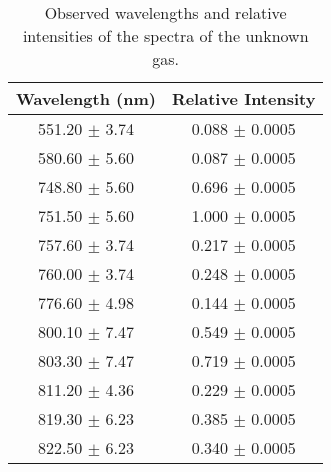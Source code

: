\begin{table}
    \begin{adjustbox}{width=0.5\textwidth, center}
        \begin{tabular}{|c|c|}
            \hline
            Wavelength (nm)   & Relative Intensity  \\
            \hline
            551.20 $\pm$ 3.74 & 0.088  $\pm$ 0.0005 \\
            580.60 $\pm$ 5.60 & 0.087  $\pm$ 0.0005 \\
            748.80 $\pm$ 5.60 & 0.696  $\pm$ 0.0005 \\
            751.50 $\pm$ 5.60 & 1.000  $\pm$ 0.0005 \\
            757.60 $\pm$ 3.74 & 0.217  $\pm$ 0.0005 \\
            760.00 $\pm$ 3.74 & 0.248  $\pm$ 0.0005 \\
            776.60 $\pm$ 4.98 & 0.144  $\pm$ 0.0005 \\
            800.10 $\pm$ 7.47 & 0.549  $\pm$ 0.0005 \\
            803.30 $\pm$ 7.47 & 0.719  $\pm$ 0.0005 \\
            811.20 $\pm$ 4.36 & 0.229  $\pm$ 0.0005 \\
            819.30 $\pm$ 6.23 & 0.385  $\pm$ 0.0005 \\
            822.50 $\pm$ 6.23 & 0.340  $\pm$ 0.0005 \\
            \hline
        \end{tabular}
    \end{adjustbox}
    \caption{Observed wavelengths and relative intensities of the spectra of the unknown gas.}
    \label{tab:unknown}
\end{table}